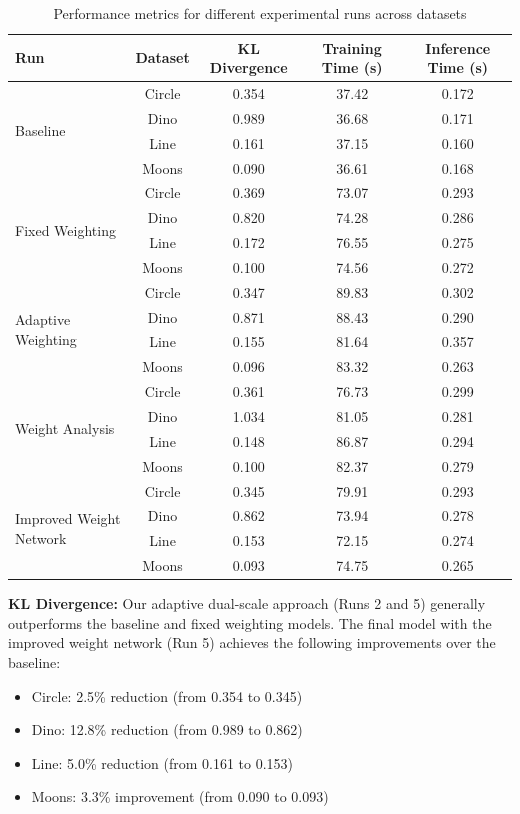 \documentclass{article} %
\begin{document}
\begin{table}[h]
\centering
\caption{Performance metrics for different experimental runs across datasets}
\label{tab:results}
\begin{tabular}{lcccc}
\toprule
Run & Dataset & KL Divergence & Training Time (s) & Inference Time (s) \\
\midrule
\multirow{4}{*}{Baseline} & Circle & 0.354 & 37.42 & 0.172 \\
 & Dino & 0.989 & 36.68 & 0.171 \\
 & Line & 0.161 & 37.15 & 0.160 \\
 & Moons & 0.090 & 36.61 & 0.168 \\
\midrule
\multirow{4}{*}{Fixed Weighting} & Circle & 0.369 & 73.07 & 0.293 \\
 & Dino & 0.820 & 74.28 & 0.286 \\
 & Line & 0.172 & 76.55 & 0.275 \\
 & Moons & 0.100 & 74.56 & 0.272 \\
\midrule
\multirow{4}{*}{Adaptive Weighting} & Circle & 0.347 & 89.83 & 0.302 \\
 & Dino & 0.871 & 88.43 & 0.290 \\
 & Line & 0.155 & 81.64 & 0.357 \\
 & Moons & 0.096 & 83.32 & 0.263 \\
\midrule
\multirow{4}{*}{Weight Analysis} & Circle & 0.361 & 76.73 & 0.299 \\
 & Dino & 1.034 & 81.05 & 0.281 \\
 & Line & 0.148 & 86.87 & 0.294 \\
 & Moons & 0.100 & 82.37 & 0.279 \\
\midrule
\multirow{4}{*}{Improved Weight Network} & Circle & 0.345 & 79.91 & 0.293 \\
 & Dino & 0.862 & 73.94 & 0.278 \\
 & Line & 0.153 & 72.15 & 0.274 \\
 & Moons & 0.093 & 74.75 & 0.265 \\
\bottomrule
\end{tabular}
\end{table}

\textbf{KL Divergence:} Our adaptive dual-scale approach (Runs 2 and 5) generally outperforms the baseline and fixed weighting models. The final model with the improved weight network (Run 5) achieves the following improvements over the baseline:
\begin{itemize}
    \item Circle: 2.5\% reduction (from 0.354 to 0.345)
    \item Dino: 12.8\% reduction (from 0.989 to 0.862)
    \item Line: 5.0\% reduction (from 0.161 to 0.153)
    \item Moons: 3.3\% improvement (from 0.090 to 0.093)
\end{itemize}
\end{document}
